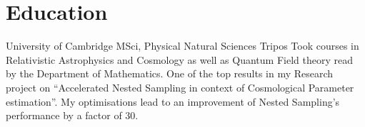 \documentclass{CurriculumVitae}[10pt, condensed]
\begin{document}
{\begin{comment}
  \section*{Volunteer work} \job{2015}{2017}{Queens' College}
  {Technical director} {I supervised a self-motivated team of
    volunteers to set up and dismantle decorations at the Queens'
    College Fitzpatrick Hall, as well as handle Audio visual equiment
    including but not limited to ROBE colorspots, human sized
    speakers, trusses, stage hydraulics, a laser projector and
    multiple smoke machines.  During QErgs 2016 (which is the largest
    indoors rowing competition in the world), we had a large
    issue. The Ergs (devices which measured the sportspeople's
    performance) were located at the far side of the hall, right under
    the projector screen and opposite the projector. They had to be
    connected to the projector via a CAT6 shielded wire. As it turned
    out, the shielded wire didn't have enough range, and the race
    would have been called off.  I quickly made a skype call with
    desktop sharing to the Wi-Fi connected laptop at the far side. }
\end{comment}
  \vfill
  \section*{Education}%

   {University of Cambridge} {MSci, }
  {Physical Natural Sciences Tripos} {Took courses in Relativistic
    Astrophysics and Cosmology as well as Quantum Field theory read by
    the Department of Mathematics. One of the top results in my
    Research project on ``Accelerated Nested Sampling in context of
    Cosmological Parameter estimation''. My optimisations lead to an
    improvement of Nested Sampling's performance by a factor of 30. }

\begin{comment}
  \education{2015}{2018}
  {University of Cambridge} {BA, Upper \nth{2}}{Physical Natural Sciences
    Tripos} {Received the Cambridge Trust scholarship. Formal training
    in Functional Programming and OOP.\@ Took optional courses in
    Theoretical Physics. \nth{1} class in Research Review on the topic
    of ``Charge Fractionalisation in Poly-acetylene''. Was forced to
    intermit for a year due to mandatory millitary service in my home
    country of Armenia. }
\end{comment}

}
\end{document}
